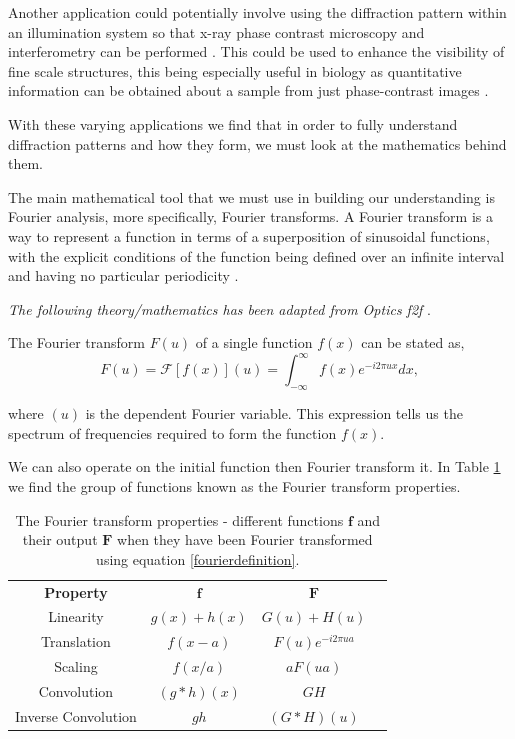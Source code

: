 \documentclass[twocolumn]{revtex4}
\begin{document}
Another application could potentially involve using the diffraction pattern within an illumination system so that x-ray phase contrast microscopy and interferometry can be performed \cite{singleslit}. This could be used to enhance the visibility of fine scale structures, this being especially useful in biology as quantitative information can be obtained about a sample from just phase-contrast images \cite{xrayphase}.

With these varying applications we find that in order to fully understand diffraction patterns and how they form, we must look at the mathematics behind them. 

The main mathematical tool that we must use in building our understanding is Fourier analysis, more specifically, Fourier transforms. A Fourier transform is a way to represent a function in terms of a superposition of sinusoidal functions, with the explicit conditions of the function being defined over an infinite interval and having no particular periodicity \cite{mathmethods}.

\textit{The following theory/mathematics has been adapted from Optics f2f} \cite{of2f}.

The Fourier transform $F(u)$ of a single function $f(x)$ can be stated as,
\begin{equation}
F(u) = \mathcal{F}[f(x)](u) = \int_{-\infty}^\infty f(x) e^{-i2\pi ux}dx,
\label{fourierdefinition}
\end{equation}

where $(u)$ is the dependent Fourier variable. This expression tells us the spectrum of frequencies required to form the function $f(x)$.

We can also operate on the initial function then Fourier transform it. In Table \ref{fourierproperties} we find the group of functions known as the Fourier transform properties.
\begin{table}[h!]
\centering
\begin{tabular}{c@{\hskip 20pt}c@{\hskip 20pt}c@{\hskip 20pt}c} 
 \hline
 \textbf{Property} & \textbf{$\boldsymbol{f}$} & \textbf{$\boldsymbol{F}$} \\ [0.5ex] 
 Linearity				& $g(x)+h(x)$ & $G(u) + H(u)$ \\
 Translation 			& $f(x-a)$ 	& $F(u)e^{-i2\pi ua}$ \\ 
 Scaling 				& $f({x/a})$ & $aF(ua)$ \\
 Convolution			& $(g*h)(x)$ & $GH$ \\
 Inverse Convolution		& $gh$ & $ (G*H)(u)$ \\
 \hline
\end{tabular}
\caption{The Fourier transform properties - different functions $\boldsymbol{f}$ and their output $\textbf{$\boldsymbol{F}$}$ when they have been Fourier transformed using equation \ref{fourierdefinition}.}
\label{fourierproperties}
\end{table}
\end{document}
